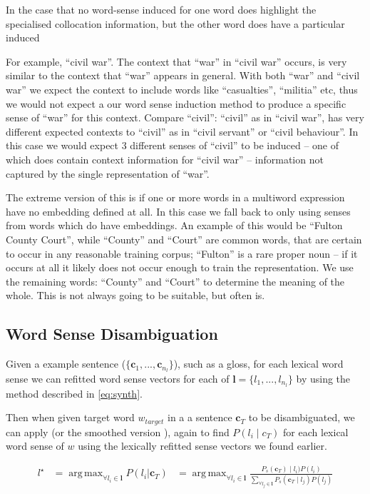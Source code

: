 \documentclass{sig-alternate}
\renewcommand{\c}{\mathbf{c}}
\renewcommand{\l}{\mathbf{l}}
\DeclareMathOperator*{\argmax}{arg\,max}
\begin{document}
In the case that no word-sense induced for one word does highlight the specialised collocation information, but the other word does have a particular induced

For example, ``civil war''. The context that ``war'' in ``civil war'' occurs, is very similar to the context that ``war'' appears in general. With both ``war'' and ``civil war'' we expect the context to include words like ``casualties'', ``militia'' etc, thus we would not expect a our word sense induction method to produce a specific sense of ``war'' for this context.
Compare ``civil'': ``civil'' as in ``civil war'', has very different expected contexts to ``civil'' as in ``civil servant'' or ``civil behaviour''. In this case we would expect 3 different senses of ``civil'' to be induced -- one of which does contain context information for ``civil war'' -- information not captured by the single representation of ``war''.

The extreme version of this is if one or more words in a multiword expression have no embedding defined at all. In this case we fall back to only using senses from words which do have embeddings. An example of this would be ``Fulton County Court'', while ``County'' and ``Court'' are common words, that are certain to occur in any reasonable training corpus; ``Fulton'' is a rare proper noun -- if it occurs at all it likely does not occur enough to train the representation. We use the remaining words: ``County'' and ``Court'' to determine the meaning of the whole. This is not always going to be suitable, but often is.

\subsection{Word Sense Disambiguation} \label{lexicalWSD}
Given a example sentence ($\{\c_1,...,\c_{n_l}\}$), such as a gloss, for each lexical word sense we can refitted word sense vectors for each of $\l=\{l_1,..., l_{n_l}\}$ by using the method described in \cref{eq:synth}.

Then when given target word $w_{target}$ in a a sentence $\c_{T}$ to be disambiguated, we can apply  (or the smoothed version ), again to find $P(l_i \mid c_{T})$ for each lexical word sense of $w$ using the lexically refitted sense vectors we found earlier.

\[
\begin{aligned}\label{eq:lexicalwsd}
l^\star &= \argmax_{\forall l_i \in \l} P(l_i|\c_T)
&= \argmax_{\forall l_i \in \l} \frac{P_s(\c_T) \mid l_i)P(l_i)}{\sum_{\forall l_j \in \l} P_s(\c_T \mid l_j)P(l_j)}
\end{aligned}
\]
\end{document}
